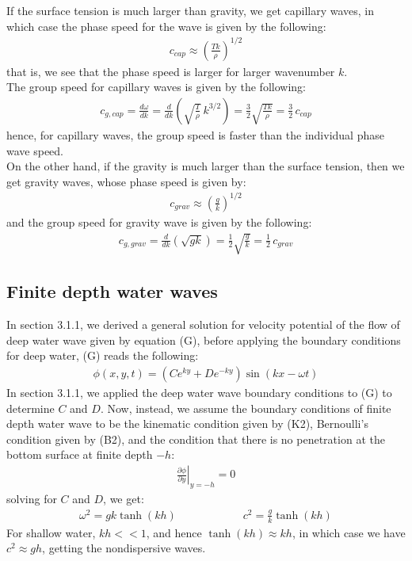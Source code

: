 \documentclass[11pt]{book}
\theoremstyle{break}
\theoremstyle{break}
\begin{document}
If the surface tension is much larger than gravity, we get capillary waves, in which case the phase speed for the wave is given by the following:
\begin{align*}
c_{cap} \approx \left( \frac{Tk}{\rho}\right)^{1/2}
\end{align*}
that is, we see that the phase speed is larger for larger wavenumber $k$. \\
The group speed for capillary waves is given by the following:
\begin{align*}
c_{g,cap} = \frac{d\omega}{dk} = \frac{d}{dk}\left( \sqrt{\frac{T}{\rho}}\, k^{3/2}\right) = \frac{3}{2}\sqrt{\frac{Tk}{\rho}} = \frac{3}{2}\, c_{cap}
\end{align*}
hence, for capillary waves, the group speed is faster than the individual phase wave speed.\\

On the other hand, if the gravity is much larger than the surface tension, then we get gravity waves, whose phase speed is given by:
\begin{align*}
c_{grav} \approx \left( \frac{g}{k}\right)^{1/2}
\end{align*}
and the group speed for gravity wave is given by the following:
\begin{align*}
c_{g, grav} = \frac{d}{dk}\left( \sqrt{gk}\right) = \frac{1}{2}\sqrt{\frac{g}{k}} = \frac{1}{2}\, c_{grav}
\end{align*}


\subsection{Finite depth water waves}
In section 3.1.1, we derived a general solution for velocity potential of the flow of deep water wave given by equation (G), before applying the boundary conditions for deep water, (G) reads the following:
\begin{align*}
\phi(x,y,t) = (Ce^{ky} + De^{-ky})\sin(kx-\omega t) \tag{G}
\end{align*}
In section 3.1.1, we applied the deep water wave boundary conditions to (G) to determine $C$ and $D$. Now, instead, we assume the boundary conditions of finite depth water wave to be the kinematic condition given by (K2), Bernoulli's condition given by (B2), and the condition that there is no penetration at the bottom surface at finite depth $-h$:
\begin{align*}
\left.\frac{\partial \phi}{\partial y}\right|_{y=-h} = 0
\end{align*}
solving for $C$ and $D$, we get:
\begin{align*}
\omega^2 = gk \tanh(kh)\qquad\qquad\qquad c^2=\frac{g}{k}\tanh(kh)
\end{align*}
For shallow water, $kh<<1$, and hence $\tanh(kh)\approx kh$, in which case we have $c^2 \approx gh$, getting the nondispersive waves. \\
\end{document}
